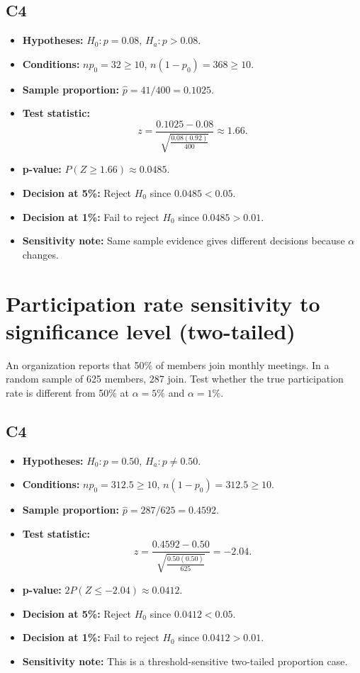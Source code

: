 \subsection*{C4}
\begin{itemize}
    \item \textbf{Hypotheses:} \(H_0\colon p=0.08\), \(H_a\colon p>0.08\).
    \item \textbf{Conditions:} \(np_0=32\ge10\), \(n(1-p_0)=368\ge10\).
    \item \textbf{Sample proportion:} \(\hat p=41/400=0.1025\).
    \item \textbf{Test statistic:}
    \[
    z=\frac{0.1025-0.08}{\sqrt{\frac{0.08(0.92)}{400}}}\approx 1.66.
    \]
    \item \textbf{p-value:} \(P(Z\ge 1.66)\approx 0.0485\).
    \item \textbf{Decision at 5\%:} Reject \(H_0\) since \(0.0485<0.05\).
    \item \textbf{Decision at 1\%:} Fail to reject \(H_0\) since \(0.0485>0.01\).
    \item \textbf{Sensitivity note:} Same sample evidence gives different decisions because \(\alpha\) changes.
\end{itemize}

\begin{center}
\hspace{0.8cm}
\end{center}


\section{Participation rate sensitivity to significance level (two-tailed)}
An organization reports that 50\% of members join monthly meetings. In a random sample of 625 members, 287 join. Test whether the true participation rate is different from 50\% at \(\alpha=5\%\) and \(\alpha=1\%\).

\subsection*{C4}
\begin{itemize}
    \item \textbf{Hypotheses:} \(H_0\colon p=0.50\), \(H_a\colon p\ne0.50\).
    \item \textbf{Conditions:} \(np_0=312.5\ge10\), \(n(1-p_0)=312.5\ge10\).
    \item \textbf{Sample proportion:} \(\hat p=287/625=0.4592\).
    \item \textbf{Test statistic:}
    \[
    z=\frac{0.4592-0.50}{\sqrt{\frac{0.50(0.50)}{625}}}=-2.04.
    \]
    \item \textbf{p-value:} \(2P(Z\le -2.04)\approx 0.0412\).
    \item \textbf{Decision at 5\%:} Reject \(H_0\) since \(0.0412<0.05\).
    \item \textbf{Decision at 1\%:} Fail to reject \(H_0\) since \(0.0412>0.01\).
    \item \textbf{Sensitivity note:} This is a threshold-sensitive two-tailed proportion case.
\end{itemize}


